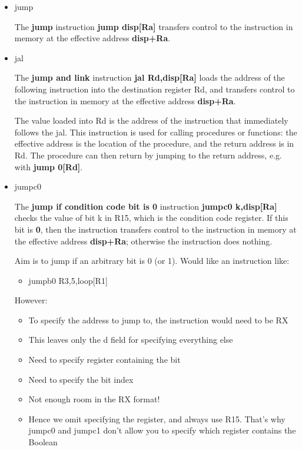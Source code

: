 \documentclass[11pt]{article}
\begin{document}
\begin{itemize}
\item jump
\label{sec:org38b9bb4}

The \textbf{\textbf{jump}} instruction \textbf{jump disp[Ra]} transfers control to the
instruction in memory at the effective address \textbf{disp+Ra}.

\item jal
\label{sec:orga6be87d}

The \textbf{\textbf{jump and link}} instruction \textbf{jal Rd,disp[Ra]} loads the address
of the following instruction into the destination register Rd, and
transfers control to the instruction in memory at the effective
address \textbf{disp+Ra}.

The value loaded into Rd is the address of the instruction that
immediately follows the jal.  This instruction is used for calling
procedures or functions: the effective address is the location of the
procedure, and the return address is in Rd.  The procedure can then
return by jumping to the return address, e.g. with \textbf{jump 0[Rd]}.

\item jumpc0
\label{sec:org25782e8}

The \textbf{\textbf{jump if condition code bit is 0}} instruction \textbf{jumpc0
k,disp[Ra]} checks the value of bit k in R15, which is the condition
code register.  If this bit is \textbf{0}, then the instruction transfers
control to the instruction in memory at the effective address
\textbf{disp+Ra}; otherwise the instruction does nothing.

Aim is to jump if an arbitrary bit is 0 (or 1).  Would like an
instruction like:
\begin{itemize}
\item jumpb0 R3,5,loop[R1]
\end{itemize}
However:
\begin{itemize}
\item To specify the address to jump to, the instruction would need to be
RX
\item This leaves only the d field for specifying everything else
\item Need to specify register containing the bit
\item Need to specify the bit index
\item Not enough room in the RX format!
\item Hence we omit specifying the register, and always use R15.  That's
why jumpc0 and jumpc1 don't allow you to specify which register
contains the Boolean
\end{itemize}


\end{itemize}
\end{document}
